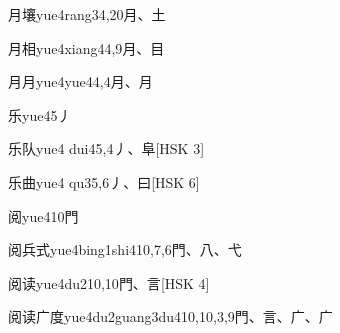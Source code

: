 \begin{EntryWithPhonetic}{月壤}{yue4rang3}{4,20}{⽉、⼟}
\end{EntryWithPhonetic}

\begin{EntryWithPhonetic}{月相}{yue4xiang4}{4,9}{⽉、⽬}
\end{EntryWithPhonetic}

\begin{EntryWithPhonetic}{月月}{yue4yue4}{4,4}{⽉、⽉}
\end{EntryWithPhonetic}

\begin{EntryWithPhonetic}{乐}{yue4}{5}{⼃}
\end{EntryWithPhonetic}

\begin{EntryWithPhonetic}{乐队}{yue4 dui4}{5,4}{⼃、⾩}[HSK 3]
\end{EntryWithPhonetic}

\begin{EntryWithPhonetic}{乐曲}{yue4 qu3}{5,6}{⼃、⽈}[HSK 6]
\end{EntryWithPhonetic}

\begin{EntryWithPhonetic}{阅}{yue4}{10}{⾨}
\end{EntryWithPhonetic}

\begin{EntryWithPhonetic}{阅兵式}{yue4bing1shi4}{10,7,6}{⾨、⼋、⼷}
\end{EntryWithPhonetic}

\begin{EntryWithPhonetic}{阅读}{yue4du2}{10,10}{⾨、⾔}[HSK 4]
\end{EntryWithPhonetic}

\begin{EntryWithPhonetic}{阅读广度}{yue4du2guang3du4}{10,10,3,9}{⾨、⾔、⼴、⼴}
\end{EntryWithPhonetic}

